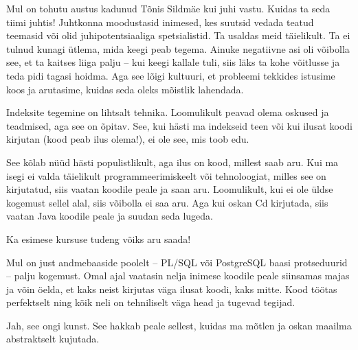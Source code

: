 Mul on tohutu austus kadunud Tõnis Sildmäe kui juhi 
vastu. Kuidas ta seda tiimi juhtis! Juhtkonna moodustasid inimesed, kes suutsid 
vedada teatud teemasid või olid juhipotentsiaaliga spetsialistid. Ta 
usaldas meid täielikult. Ta ei tulnud kunagi ütlema, mida keegi peab tegema. 
Ainuke negatiivne asi oli võibolla see, et ta kaitses liiga palju -- kui 
keegi kallale tuli, siis läks ta kohe võitlusse ja teda pidi tagasi 
hoidma. Aga see lõigi kultuuri, et probleemi tekkides istusime koos
ja arutasime, kuidas seda oleks mõistlik lahendada. 


Indeksite tegemine on lihtsalt tehnika. Loomulikult peavad olema 
oskused ja teadmised, aga see on õpitav. See, kui 
hästi ma indekseid teen või kui ilusat koodi kirjutan (kood peab ilus 
olema!), ei ole see, mis toob edu. 


See kõlab nüüd hästi populistlikult, aga ilus on kood, millest saab aru. Kui ma isegi ei valda täielikult programmeerimiskeelt või 
tehnoloogiat, milles see on kirjutatud, siis vaatan koodile peale ja saan aru. 
Loomulikult, kui ei ole üldse kogemust sellel alal, siis 
võibolla ei saa aru. Aga kui oskan Cd kirjutada, siis vaatan Java koodile 
peale ja suudan seda lugeda. 


Ka esimese kursuse tudeng võiks aru saada!

Mul on just andmebaaside poolelt -- PL/SQL või PostgreSQL \mbox{baasi} protseduurid -- palju kogemust. Omal ajal vaatasin nelja inimese 
koodile peale siinsamas majas ja võin öelda, et kaks neist kirjutas väga ilusat koodi, kaks mitte. 
Kood töötas perfektselt ning kõik neli on tehniliselt väga head ja tugevad tegijad. 


Jah, see ongi kunst. See hakkab peale sellest, kuidas ma mõtlen ja 
oskan maailma abstraktselt kujutada. 


